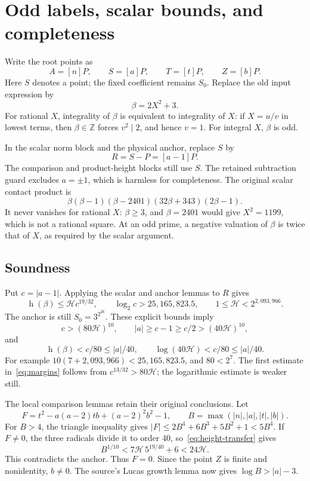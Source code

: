 \documentclass[11pt]{article}
\newcommand{\Z}{\mathbb Z}
\newcommand{\HH}{\mathcal H}
\newcommand{\htw}{\operatorname h}
\begin{document}
\section{Odd labels, scalar bounds, and completeness}\label{sec:labels}
Write the root points as
\[
 A=[n]P,\qquad S=[a]P,\qquad T=[t]P,\qquad Z=[b]P.
\]
Here $S$ denotes a point; the fixed coefficient remains $S_0$. Replace the old input expression by
\[
 \beta=2X^2+3.
\]
For rational $X$, integrality of $\beta$ is equivalent to integrality of $X$: if $X=u/v$ in lowest terms, then $\beta\in\Z$ forces $v^2\mid2$, and hence $v=1$. For integral $X$, $\beta$ is odd.

In the scalar norm block and the physical anchor, replace $S$ by
\[
 R=S-P=[a-1]P.
\]
The comparison and product-height blocks still use $S$. The retained subtraction guard excludes $a=\pm1$, which is harmless for completeness. The original scalar contact product is
\[
 \beta(\beta-1)(\beta-2401)(32\beta+343)(2\beta-1).
\]
It never vanishes for rational $X$: $\beta\ge3$, and $\beta=2401$ would give $X^2=1199$, which is not a rational square. At an odd prime, a negative valuation of $\beta$ is twice that of $X$, as required by the scalar argument.

\subsection{Soundness}
Put $c=|a-1|$. Applying the scalar and anchor lemmas to $R$ gives
\[
 \htw(\beta)\le\HH c^{19/32},\qquad
 \log_2c>25{,}165{,}823.5,
 \qquad 1\le\HH<2^{2{,}093{,}966}.
\]
The anchor is still $S_0=3^{2^{26}}$. These explicit bounds imply
\[
 c>(80\HH)^{10},\qquad
 |a|\ge c-1\ge c/2>(40\HH)^{10},
\]
and
\begin{equation}\label{eq:margins}
 \htw(\beta)<c/80\le |a|/40,
 \qquad\log(40\HH)<c/80\le |a|/40.
\end{equation}
For example $10(7+2{,}093{,}966)<25{,}165{,}823.5$, and $80<2^7$. The first estimate in~\eqref{eq:margins} follows from $c^{13/32}>80\HH$; the logarithmic estimate is weaker still.

The local comparison lemmas retain their original conclusions. Let
\[
 F=t^2-a(a-2)tb+(a-2)^2b^2-1,
 \qquad B=\max(|n|,|a|,|t|,|b|).
\]
For $B>4$, the triangle inequality gives $|F|\le2B^4+6B^3+5B^2+1<5B^4$. If $F\ne0$, the three radicals divide it to order 40, so~\eqref{eq:height-transfer} gives
\[
 B^{1/10}<7\HH\,5^{19/40}+6<24\HH.
\]
This contradicts the anchor. Thus $F=0$. Since the point $Z$ is finite and nonidentity, $b\ne0$. The source's Lucas growth lemma now gives $\log B>|a|-3$.
\end{document}

